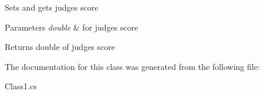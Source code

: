 Sets and gets judge\textquotesingle{}s score 
\begin{DoxyParams}{Parameters}
{\em double} & for judge\textquotesingle{}s score \\
\hline
\end{DoxyParams}
\begin{DoxyReturn}{Returns}
double of judge\textquotesingle{}s score 
\end{DoxyReturn}


The documentation for this class was generated from the following file\+:\begin{DoxyCompactItemize}
\item 
Class1.\+cs\end{DoxyCompactItemize}
